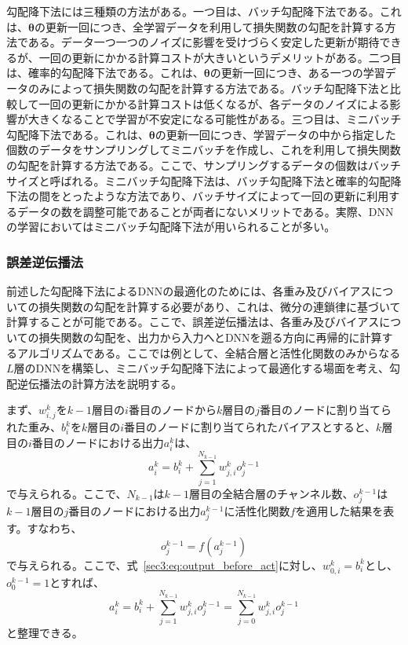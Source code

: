 \documentclass[12pt]{jarticle}
\numberwithin{equation}{section}    %
\numberwithin{figure}{section}      %
\numberwithin{table}{section}      %
\begin{document}
勾配降下法には三種類の方法がある。一つ目は、バッチ勾配降下法である。これは、$\bm{\theta}$の更新一回につき、全学習データを利用して損失関数の勾配を計算する方法である。データ一つ一つのノイズに影響を受けづらく安定した更新が期待できるが、一回の更新にかかる計算コストが大きいというデメリットがある。二つ目は、確率的勾配降下法である。これは、$\bm{\theta}$の更新一回につき、ある一つの学習データのみによって損失関数の勾配を計算する方法である。バッチ勾配降下法と比較して一回の更新にかかる計算コストは低くなるが、各データのノイズによる影響が大きくなることで学習が不安定になる可能性がある。三つ目は、ミニバッチ勾配降下法である。これは、$\bm{\theta}$の更新一回につき、学習データの中から指定した個数のデータをサンプリングしてミニバッチを作成し、これを利用して損失関数の勾配を計算する方法である。ここで、サンプリングするデータの個数はバッチサイズと呼ばれる。ミニバッチ勾配降下法は、バッチ勾配降下法と確率的勾配降下法の間をとったような方法であり、バッチサイズによって一回の更新に利用するデータの数を調整可能であることが両者にないメリットである。実際、DNNの学習においてはミニバッチ勾配降下法が用いられることが多い。

\subsubsection{誤差逆伝播法}
\label{sec3:sec:backpropagation}
前述した勾配降下法によるDNNの最適化のためには、各重み及びバイアスについての損失関数の勾配を計算する必要があり、これは、微分の連鎖律に基づいて計算することが可能である。ここで、誤差逆伝播法は、各重み及びバイアスについての損失関数の勾配を、出力から入力へとDNNを遡る方向に再帰的に計算するアルゴリズムである。ここでは例として、全結合層と活性化関数のみからなる$L$層のDNNを構築し、ミニバッチ勾配降下法によって最適化する場面を考え、勾配逆伝播法の計算方法を説明する。

まず、$w_{i, j}^{k}$を$k - 1$層目の$i$番目のノードから$k$層目の$j$番目のノードに割り当てられた重み、$b_{i}^{k}$を$k$層目の$i$番目のノードに割り当てられたバイアスとすると、$k$層目の$i$番目のノードにおける出力$a_{i}^{k}$は、
\begin{equation}
    \label{sec3:eq:output_before_act}
    a_{i}^{k} = b_{i}^{k} + \sum_{j = 1}^{N_{k - 1}}w_{j, i}^{k}o_{j}^{k - 1}
\end{equation}
で与えられる。ここで、$N_{k - 1}$は$k - 1$層目の全結合層のチャンネル数、$o_{j}^{k - 1}$は$k - 1$層目の$j$番目のノードにおける出力$a_{j}^{k - 1}$に活性化関数$f$を適用した結果を表す。すなわち、
\begin{equation}
    o_{j}^{k - 1} = f(a_{j}^{k - 1})
\end{equation}
で与えられる。ここで、式~\eqref{sec3:eq:output_before_act}に対し、$w_{0, i}^{k} = b_{i}^{k}$とし、$o_{0}^{k - 1} = 1$とすれば、
\begin{equation}
    \label{sec3:eq:output_before_act_2}
    a_{i}^{k} = b_{i}^{k} + \sum_{j = 1}^{N_{k - 1}}w_{j, i}^{k}o_{j}^{k - 1}
    = \sum_{j = 0}^{N_{k - 1}}w_{j, i}^{k}o_{j}^{k - 1}
\end{equation}
と整理できる。
\end{document}
